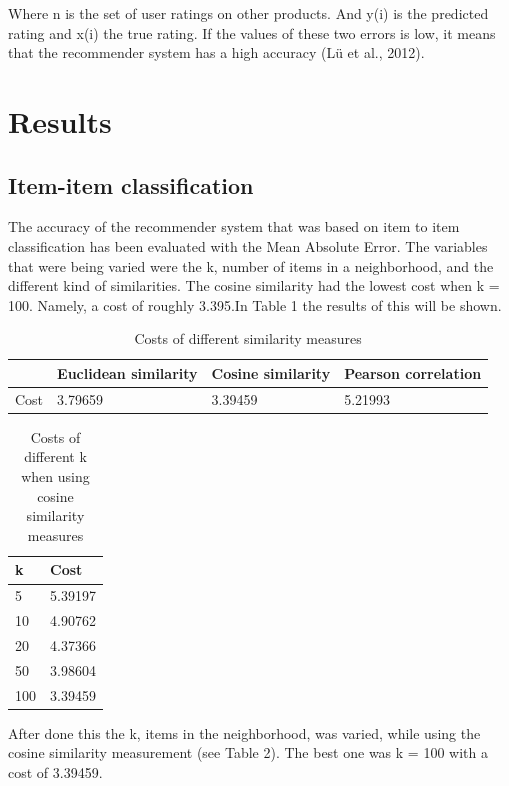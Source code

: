 \documentclass[11pt]{article}
\begin{document}
Where n is the set of user ratings on other products. And y(i) is the predicted rating and x(i)  the true rating. 
If the values of these two errors is low, it means that the recommender system has a high accuracy (Lü et al., 2012). 

\section{Results}
\subsection{Item-item classification}
The accuracy of the recommender system that was based on item to item classification has been evaluated with the Mean Absolute Error. The variables that were being varied were the k, number of items in a neighborhood, and the different kind of similarities. The cosine similarity had the lowest cost when k = 100. Namely, a cost of roughly 3.395.In Table 1 the results of this will be shown.\\
 
\newpage

\begin{table}[]
\begin{tabular}{@{}|l|l|l|l|@{}}
\toprule
     & Euclidean similarity & Cosine similarity & Pearson correlation \\ \midrule
Cost & 3.79659              & 3.39459           & 5.21993             \\ \bottomrule
\end{tabular}
\caption{Costs of different similarity measures}
\end{table}


\begin{table}[]
\begin{tabular}{@{}ll@{}}
\toprule
k   & Cost    \\ \midrule
5   & 5.39197 \\
10  & 4.90762 \\
20  & 4.37366 \\
50  & 3.98604 \\
100 & 3.39459 \\ \bottomrule
\end{tabular}
\caption{Costs of different k when using cosine similarity measures}
\end{table}

After done this the k, items in the neighborhood, was varied, while using the cosine similarity measurement (see Table 2). The best one was k = 100 with a cost of 3.39459.
\end{document}
